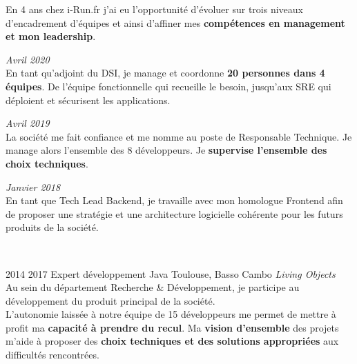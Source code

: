 \documentclass{friggeri-cv} 	%
\begin{document}
\begin{entrylist}
{En 4 ans chez i-Run.fr j’ai eu l’opportunité d’évoluer sur trois niveaux d’encadrement d’équipes et ainsi d’affiner mes \textbf{compétences en management et mon leadership}.
\begin{description}[leftmargin=0cm]
    \item [\hspace*{-1cm}\bodyfont{|} \normalfont \textbf{\color{orange}CTO \color{headercolor}Adjoint}] \hfill \textit{Avril 2020}\\
    En tant qu’adjoint du DSI, je manage et coordonne \textbf{20 personnes dans 4 équipes}. De l’équipe fonctionnelle qui recueille le besoin,
    jusqu’aux SRE qui déploient et sécurisent les applications.
    \item [\hspace*{-1cm}\bodyfont{|} \normalfont \textbf{\color{orange}Responsable \color{headercolor}Technique}] \hfill \textit{Avril 2019}\\
    La société me fait confiance et me nomme au poste de Responsable Technique. Je manage alors l’ensemble des 8 développeurs. 
    Je \textbf{supervise l’ensemble des choix techniques}.
    \item[\hspace*{-1cm}\bodyfont{|} \normalfont \textbf{\color{orange}Tech \color{headercolor}Lead Backend}] \hfill \textit{Janvier 2018}\\
    En tant que Tech Lead Backend, je travaille avec mon homologue Frontend afin de proposer une stratégie et une architecture logicielle cohérente
    pour les futurs produits de la société.
\end{description}
\
}

\entry
{2014  2017}
{Expert développement Java}
{Toulouse, Basso Cambo}
{\vspace{0.2cm}\emph{Living Objects} \\
Au sein du département Recherche \& Développement, je participe au développement du produit principal de la société.\\
L’autonomie laissée à notre équipe de 15 développeurs me permet de mettre à profit ma \textbf{capacité à prendre du recul}. Ma \textbf{vision d’ensemble} des projets m’aide à proposer des \textbf{choix techniques et des solutions appropriées} aux difficultés rencontrées.
\\}
\end{entrylist}
\end{document}
